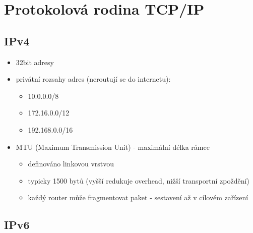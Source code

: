 \documentclass{szzclass}
\providecommand{\tightlist}{%
  \setlength{\itemsep}{0pt}\setlength{\parskip}{0pt}}
\begin{document}
\tableofcontents
\newpage



\hypertarget{protokolovuxe1-rodina-tcpip}{%
\section{Protokolová rodina
TCP/IP}\label{protokolovuxe1-rodina-tcpip}}

\hypertarget{ipv4}{%
\subsection{IPv4}\label{ipv4}}

\begin{itemize}
\tightlist
\item
  32bit adresy
\item
  privátní rozsahy adres (neroutují se do internetu):

  \begin{itemize}
  \tightlist
  \item
    10.0.0.0/8
  \item
    172.16.0.0/12
  \item
    192.168.0.0/16
  \end{itemize}
\item
  MTU (Maximum Transmission Unit) - maximální délka rámce

  \begin{itemize}
  \tightlist
  \item
    definováno linkovou vrstvou
  \item
    typicky 1500 bytů (vyšší redukuje overhead, nižší transportní
    zpoždění)
  \item
    každý router může fragmentovat paket - sestavení až v cílovém
    zařízení
  \end{itemize}
\end{itemize}

\hypertarget{ipv6}{%
\subsection{IPv6}\label{ipv6}}
\end{document}
